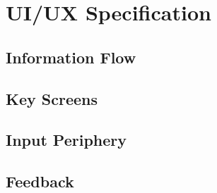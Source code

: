 \section{UI/UX Specification}

\subsection{Information Flow}

\subsection{Key Screens}

\subsection{Input Periphery}

\subsection{Feedback}

